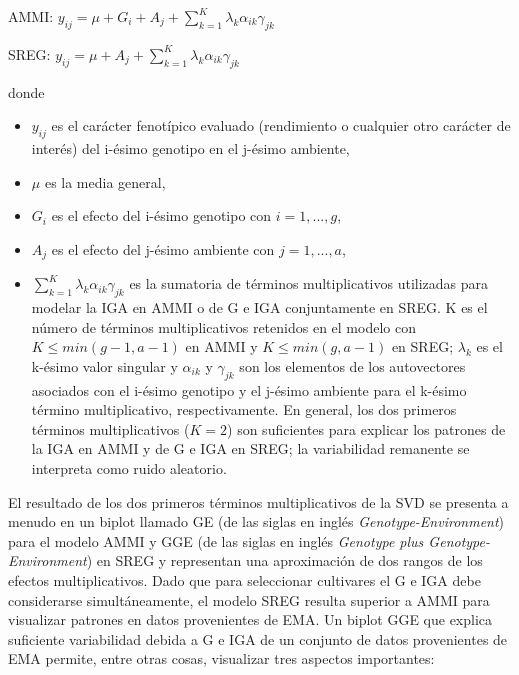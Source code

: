 \hspace{0.5cm} AMMI: $y_{ij}= \mu + G_i + A_j + \sum_{k=1}^K \lambda_k \alpha_{ik} \gamma_{jk}$

\hspace{0.5cm} SREG: $y_{ij}= \mu + A_j + \sum_{k=1}^K \lambda_k \alpha_{ik} \gamma_{jk}$ 

donde 
\begin{itemize}
\item $y_{ij}$ es el carácter fenotípico evaluado (rendimiento o cualquier otro carácter de interés) del i-ésimo genotipo en el j-ésimo ambiente,
\item $\mu$ es la media general,
\item  $G_i$ es el efecto del i-ésimo genotipo con $i=1,...,g$,
\item $A_j$ es el efecto del j-ésimo ambiente con $j=1,...,a$,
\item $\sum_{k=1}^K \lambda_k \alpha_{ik} \gamma_{jk}$ es la sumatoria de términos multiplicativos utilizadas para modelar la IGA en AMMI o de G e IGA conjuntamente en SREG. K es el número de términos multiplicativos retenidos en el modelo con $K \leq min(g-1,a-1)$ en AMMI y $K \leq min(g,a-1)$ en SREG; $\lambda_k$ es el k-ésimo valor singular y $\alpha_{ik}$ y $\gamma_{jk}$ son los elementos de los autovectores asociados con el i-ésimo genotipo y el j-ésimo ambiente para el k-ésimo término multiplicativo, respectivamente. En general, los dos primeros términos multiplicativos ($K=2$) son suficientes para explicar los patrones de la IGA en AMMI y de G e IGA en SREG; la variabilidad remanente se interpreta como ruido aleatorio. 
\end{itemize}


El resultado de los dos primeros términos multiplicativos de la SVD se presenta a menudo en un biplot llamado GE (de las siglas en inglés \emph{Genotype-Environment}) para el modelo AMMI y GGE (de las
siglas en inglés \emph{Genotype plus Genotype-Environment}) en SREG y representan una aproximación de dos rangos de los efectos multiplicativos. Dado que para seleccionar cultivares el G e IGA debe considerarse simultáneamente, el modelo SREG resulta superior a AMMI para visualizar patrones en datos provenientes de EMA. Un biplot GGE que explica suficiente variabilidad debida a G e IGA de un conjunto de datos provenientes de EMA permite, entre otras cosas, visualizar tres aspectos importantes: 

